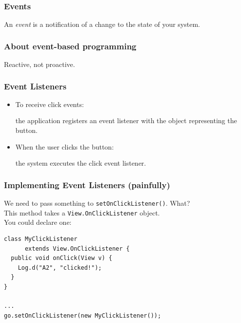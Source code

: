 \begin{frame}
\frametitle{Events}

\begin{changemargin}{1cm}
\Large
An \emph{event} is a notification of a change to the state of your system.
\end{changemargin}

\end{frame}

\begin{frame}
\frametitle{About event-based programming}

\begin{changemargin}{1cm}
\begin{itemize}
\Large Reactive, not proactive.
\end{itemize}
\end{changemargin}

\end{frame}

\begin{frame}
\frametitle{Event Listeners}

\begin{changemargin}{1cm}
\begin{itemize}
\item To receive click events: \\
\begin{changemargin}{1em}
the application registers an event 
listener with the object representing the button.\\
\end{changemargin}
\item When the user clicks the button: \\
\begin{changemargin}{1em}
the system executes the click event listener.
\end{changemargin}
\end{itemize}
\end{changemargin}

\end{frame}


\begin{frame}[fragile]
\frametitle{Implementing Event Listeners (painfully)}

\begin{changemargin}{1cm}
We need to pass something to {\tt setOnClickListener()}. What?\\[1em]

This method takes a {\tt View.OnClickListener} object.\\[1em]

You could declare one:

{\small
\begin{verbatim}
class MyClickListener 
      extends View.OnClickListener {
  public void onClick(View v) {
    Log.d("A2", "clicked!");
  }
}

...
go.setOnClickListener(new MyClickListener()); 
\end{verbatim}
}

\end{changemargin}

\end{frame}

